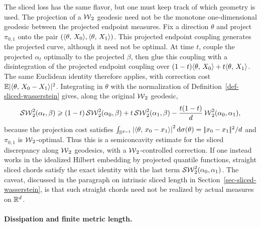 \begin{rem}
	The sliced loss has the same flavor, but one must keep track of which geometry is used. The projection of a \(\operatorname{\mathcal{W}}_2\) geodesic need not be the monotone one-dimensional geodesic between the projected endpoint measures. Fix a direction $\theta$ and project $\pi_{0,1}$ onto the pair $(\langle \theta,\,X_0\rangle,\langle \theta,\,X_1\rangle)$. This projected endpoint coupling generates the projected curve, although it need not be optimal. At time $t$, couple the projected $\alpha_t$ optimally to the projected $\beta$, then glue this coupling with a disintegration of the projected endpoint coupling over $(1-t)\langle \theta,\,X_0\rangle+t\langle \theta,\,X_1\rangle$. The same Euclidean identity therefore applies, with correction cost $\mathbb{E}|\langle \theta,\,X_0-X_1\rangle|^2$. Integrating in $\theta$ with the normalization of Definition~\ref{def-sliced-wasserstein} gives, along the original \(\operatorname{\mathcal{W}}_2\) geodesic,
	\[
		\operatorname{\mathcal{SW}}_2^2(\alpha_t,\beta)
		\geqslant
		(1-t)\operatorname{\mathcal{SW}}_2^2(\alpha_0,\beta)
		+
		t\operatorname{\mathcal{SW}}_2^2(\alpha_1,\beta)
		-
		\frac{t(1-t)}{d}\operatorname{\mathcal{W}}_2^2(\alpha_0,\alpha_1),
	\]
	because the projection cost satisfies
	\(\int_{\mathbb{S}^{d-1}}\left\lvert\langle \theta,\,x_0-x_1\rangle\right\rvert^2\mathrm{d}\sigma(\theta)=|\!| x_0-x_1 |\!|^2/d\) and \(\pi_{0,1}\) is \(\operatorname{\mathcal{W}}_2\)-optimal. Thus this is a semiconcavity estimate for the sliced discrepancy along \(\operatorname{\mathcal{W}}_2\) geodesics, with a \(\operatorname{\mathcal{W}}_2\)-controlled correction. If one instead works in the idealized Hilbert embedding by projected quantile functions, straight sliced chords satisfy the exact identity with the last term \(\operatorname{\mathcal{SW}}_2^2(\alpha_0,\alpha_1)\). The caveat, discussed in the paragraph on intrinsic sliced length in Section~\ref{sec-sliced-wasserstein}, is that such straight chords need not be realized by actual measures on \(\mathbb{R}^d\).
\end{rem}

\paragraph{Dissipation and finite metric length.}

